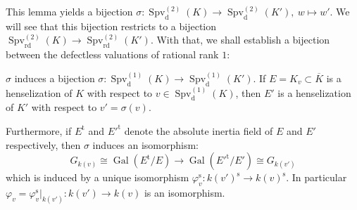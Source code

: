 This lemma yields a bijection $\sigma:\operatorname{Spv}_\text{d}^{(2)}(K) \to\operatorname{Spv}_\text{d}^{(2)}(K'),\ w\mapsto w'$. We will see that this bijection restricts to a bijection $\operatorname{Spv}_\text{rd}^{(2)}(K)\to \operatorname{Spv}_\text{rd}^{(2)}(K')$. With that, we shall establish a bijection between the defectless valuations of rational rank $1$:

\begin{lemma}\label{3.2}
$\sigma$ induces a bijection $\sigma:\operatorname{Spv}_\text{d}^{(1)}(K) \to\operatorname{Spv}_\text{d}^{(1)}(K')$. If $E=K_v\subset\overline{K}$ is a henselization of $K$ with respect to $v\in\operatorname{Spv}_\text{d}^{(1)}(K)$, then $E'$ is a henselization of $K'$ with respect to $v'=\sigma(v)$. 

Furthermore, if $E^{\text{t}}$ and $E'^{\text{t}}$ denote the absolute inertia field of $E$ and $E'$ respectively, then $\sigma$ induces an isomorphism:
\[ G_{k(v)}\cong\operatorname{Gal}(E^\text{t}/E) \to\operatorname{Gal}(E'^{\text{t}}/E')\cong G_{k(v')} \]
which is induced by a unique isomorphism $\varphi_v^\text{s}:k(v')^\text{s}\to k(v)^\text{s}$. In particular $\varphi_v=\varphi_v^\text{s}|_{k(v')}:k(v')\to k(v)$ is an isomorphism.
\end{lemma}

